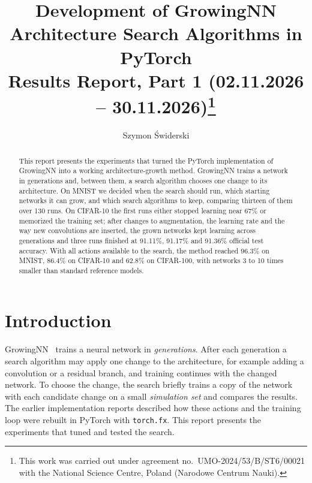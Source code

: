 \documentclass[runningheads]{llncs}
\begin{document}
\title{Development of GrowingNN Architecture Search Algorithms in PyTorch\\
Results Report, Part 1 (02.11.2026 -- 30.11.2026)\thanks{This work was carried out under agreement no.~UMO-2024/53/B/ST6/00021 with the National Science Centre, Poland (Narodowe Centrum Nauki).}}
\author{Szymon Świderski}
\institute{}
\maketitle

\begin{abstract}
This report presents the experiments that turned the PyTorch implementation of GrowingNN into a working architecture-growth method. GrowingNN trains a network in generations and, between them, a search algorithm chooses one change to its architecture. On MNIST we decided when the search should run, which starting networks it can grow, and which search algorithms to keep, comparing thirteen of them over 130 runs. On CIFAR-10 the first runs either stopped learning near 67\% or memorized the training set; after changes to augmentation, the learning rate and the way new convolutions are inserted, the grown networks kept learning across generations and three runs finished at 91.11\%, 91.17\% and 91.36\% official test accuracy. With all actions available to the search, the method reached 96.3\% on MNIST, 86.4\% on CIFAR-10 and 62.8\% on CIFAR-100, with networks 3 to 10 times smaller than standard reference models.
\end{abstract}

\section{Introduction}

GrowingNN~\cite{growingnn_original} trains a neural network in \emph{generations}. After each generation a search algorithm may apply one change to the architecture, for example adding a convolution or a residual branch, and training continues with the changed network. To choose the change, the search briefly trains a copy of the network with each candidate change on a small \emph{simulation set} and compares the results. The earlier implementation reports described how these actions and the training loop were rebuilt in PyTorch with \texttt{torch.fx}. This report presents the experiments that tuned and tested the search.
\end{document}
